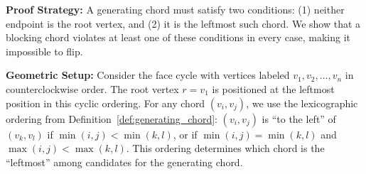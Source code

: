 \documentclass[12pt,a4paper]{article}
\theoremstyle{definition}
\theoremstyle{remark}
\begin{document}
\textbf{Proof Strategy:} A generating chord must satisfy two conditions: (1) neither endpoint is the root vertex, and (2) it is the leftmost such chord. We show that a blocking chord violates at least one of these conditions in every case, making it impossible to flip.

\textbf{Geometric Setup:} Consider the face cycle with vertices labeled $v_1, v_2, \ldots, v_n$ in counterclockwise order. The root vertex $r = v_1$ is positioned at the leftmost position in this cyclic ordering. For any chord $(v_i, v_j)$, we use the lexicographic ordering from Definition~\ref{def:generating_chord}: $(v_i, v_j)$ is ``to the left'' of $(v_k, v_l)$ if $\min(i,j) < \min(k,l)$, or if $\min(i,j) = \min(k,l)$ and $\max(i,j) < \max(k,l)$. This ordering determines which chord is the ``leftmost'' among candidates for the generating chord.
\end{document}
